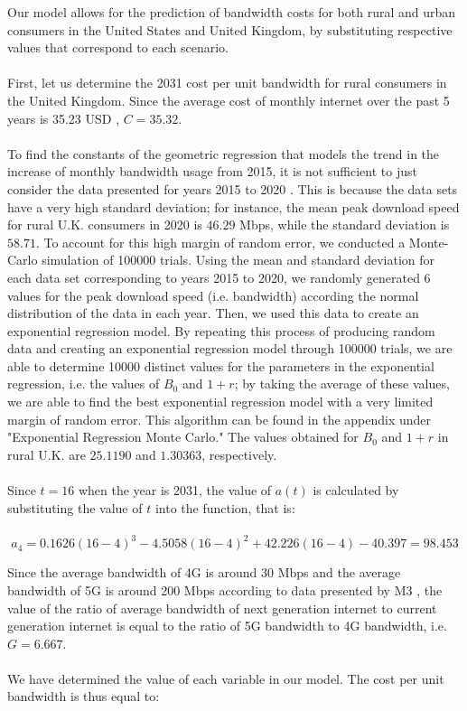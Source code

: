 \documentclass[12pt]{article}
\begin{document}
Our model allows for the prediction of bandwidth costs for both rural and urban consumers in the United States and United Kingdom, by substituting respective values that correspond to each scenario. 
\\
\\
First, let us determine the 2031 cost per unit bandwidth for rural consumers in the United Kingdom. Since the average cost of monthly internet over the past 5 years is 35.23 USD \cite{CableUK}, $C=35.32$.
\\
\\
To find the constants of the geometric regression that models the trend in the increase of monthly bandwidth usage from 2015, it is not sufficient to just consider the data presented for years 2015 to 2020 \cite{ofcom}. This is because the data sets have a very high standard deviation; for instance, the mean peak download speed for rural U.K. consumers in 2020 is $46.29$ Mbps, while the standard deviation is $58.71$. To account for this high margin of  random error, we conducted a Monte-Carlo simulation of 100000 trials. Using the mean and standard deviation for each data set corresponding to years 2015 to 2020, we randomly generated 6 values for the peak download speed (i.e. bandwidth) according the normal distribution of the data in each year. Then, we used this data to create an exponential regression model. By repeating this process of producing random data and creating an exponential regression model through 100000 trials, we are able to determine 10000 distinct values for the parameters in the exponential regression, i.e. the values of $B_0$ and $1+r$; by taking the average of these values, we are able to find the best exponential regression model with a very limited margin of random error. This algorithm can be found in the appendix under "Exponential Regression Monte Carlo." The values obtained for $B_0$ and $1+r$ in rural U.K. are $25.1190$ and $1.30363$, respectively. 
\\
\\
Since $t = 16$ when the year is 2031, the value of $a(t)$ is calculated by substituting the value of $t$ into the function, that is:
\\
\\
\begin{equation*}
    a_4 = 0.1626(16-4)^3-4.5058(16-4)^2+42.226(16-4)-40.397 = 98.453
\end{equation*}

Since the average bandwidth of 4G is around 30 Mbps and the average bandwidth of 5G is around 200 Mbps according to data presented by M3 \cite{m3}, the value of the ratio of average bandwidth of next generation internet to current generation internet is equal to the ratio of 5G bandwidth to 4G bandwidth, i.e. $G = 6.667$. 
\\
\\
We have determined the value of each variable in our model. The cost per unit bandwidth is thus equal to:
\end{document}
